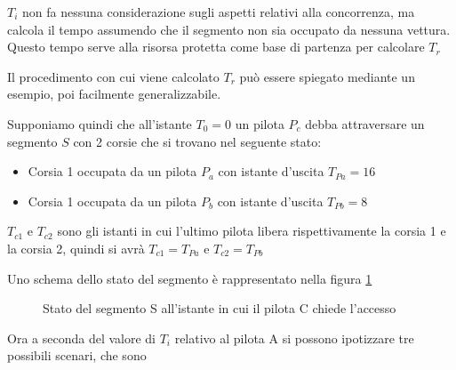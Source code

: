 \documentclass[a4paper,11pt, twoside]{book}
\begin{document}
      $T_i$ non fa nessuna considerazione sugli aspetti relativi alla concorrenza, ma calcola il tempo
      assumendo che il segmento non sia occupato da nessuna vettura. Questo tempo serve alla risorsa protetta come
      base di partenza per calcolare $T_r$
      
      Il procedimento con cui viene calcolato $T_r$ può essere spiegato mediante un esempio,
      poi facilmente generalizzabile.
      
      Supponiamo quindi che all'istante $T_0=0$ un pilota $P_c$ debba attraversare un segmento $S$ 
      con 2 corsie che si trovano nel seguente stato:
      
      \begin{itemize}
	\item Corsia 1 occupata da un pilota $P_a$ con istante d'uscita $T_{Pa}=16$
	\item Corsia 1 occupata da un pilota $P_b$ con istante d'uscita $T_{Pb}=8$
      \end{itemize}
      
      $T_{c1}$ e $T_{c2}$ sono gli istanti in cui l'ultimo pilota libera rispettivamente la corsia 1
      e la corsia 2, quindi si avrà $T_{c1} = T_{Pa}$ e $T_{c2} = T_{Pb}$
      
      Uno schema dello stato del segmento è rappresentato nella figura \ref{fgr:AccessoSegmentiStatoInziale}
      
      \begin{figure}[h]
	\centering
	\caption{Stato del segmento S all'istante in cui il pilota C chiede l'accesso}
	\label{fgr:AccessoSegmentiStatoInziale}
      \end{figure}
      
      Ora a seconda del valore di $T_i$ relativo al pilota A si possono ipotizzare tre possibili scenari, che sono
      
\end{document}

